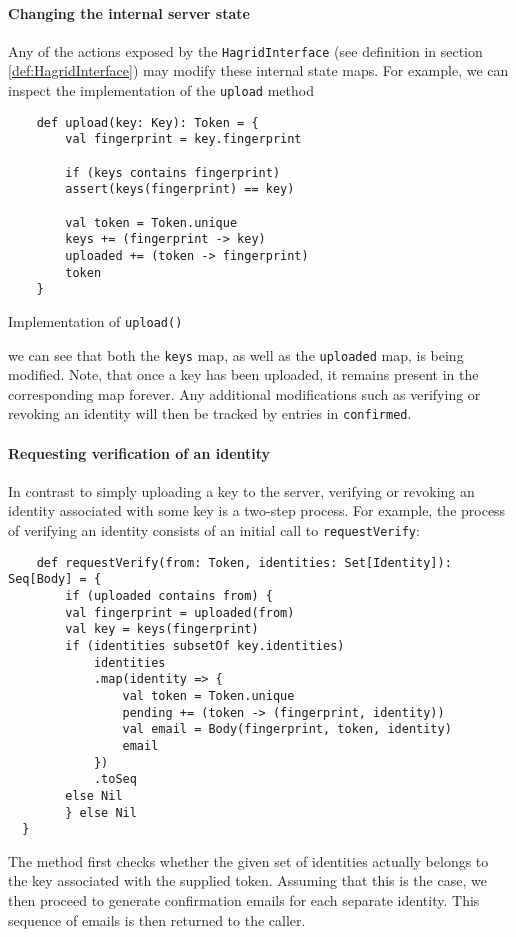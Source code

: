 \paragraph{Changing the internal server state}
Any of the actions exposed by the \texttt{HagridInterface} (see definition in section \ref{def:HagridInterface}) may modify these internal state maps.
For example, we can inspect the implementation of the \texttt{upload} method
\begin{code}
    \begin{verbatim}
    def upload(key: Key): Token = {
        val fingerprint = key.fingerprint

        if (keys contains fingerprint)
        assert(keys(fingerprint) == key)

        val token = Token.unique
        keys += (fingerprint -> key)
        uploaded += (token -> fingerprint)
        token
    }
    \end{verbatim}
    \caption{Implementation of \texttt{upload()}}
\end{code}

we can see that both the \texttt{keys} map, as well as the \texttt{uploaded} map, is being modified. Note, that once a key has been uploaded, it remains present in the corresponding map forever. Any additional modifications such as verifying or revoking an identity will then be tracked by entries in \texttt{confirmed}.

\paragraph{Requesting verification of an identity} In contrast to simply uploading a key to the server, verifying or revoking an identity associated with some key is a two-step process.
For example, the process of verifying an identity consists of an initial call to \texttt{requestVerify}:
\begin{code}
    \begin{verbatim}
    def requestVerify(from: Token, identities: Set[Identity]): Seq[Body] = {
        if (uploaded contains from) {
        val fingerprint = uploaded(from)
        val key = keys(fingerprint)
        if (identities subsetOf key.identities)
            identities
            .map(identity => {
                val token = Token.unique
                pending += (token -> (fingerprint, identity))
                val email = Body(fingerprint, token, identity)
                email
            })
            .toSeq
        else Nil
        } else Nil
  }
    \end{verbatim}
\end{code}
The method first checks whether the given set of identities actually belongs to the key associated with the supplied token. Assuming that this is the case, we then proceed to generate confirmation emails for each separate identity. This sequence of emails is then returned to the caller.

